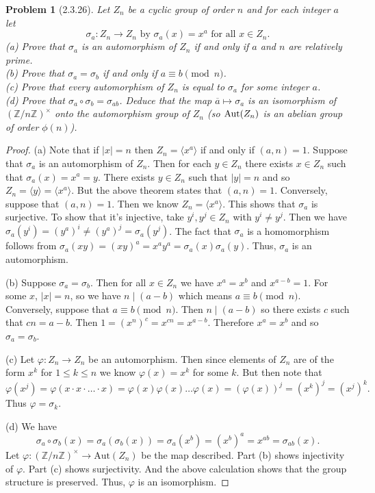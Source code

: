 \documentclass{article}
\newtheorem{problem}{Problem}
\begin{document}
\begin{problem}[2.3.26]
Let $Z_n$ be a cyclic group of order $n$ and for each integer $a$ let
\[
\sigma_a : Z_n \to Z_n \text{ by } \sigma_a(x) = x^a \text{ for all } x \in Z_n.
\]
(a) Prove that $\sigma_a$ is an automorphism of $Z_n$ if and only if $a$ and $n$ are relatively prime.\\
(b) Prove that $\sigma_a = \sigma_b$ if and only if $a \equiv b \pmod{n}$.\\
(c) Prove that \emph{every} automorphism of $Z_n$ is equal to $\sigma_a$ for some integer $a$.\\
(d) Prove that $\sigma_a \circ \sigma_b = \sigma_{ab}$. Deduce that the map $\overline{a} \mapsto \sigma_a$ is an isomorphism of $(\mathbb{Z}/n\mathbb{Z})^{\times}$ onto the automorphism group of $Z_n$ (so $\textup{Aut}(Z_n)$ is an abelian group of order $\phi(n)$).
\end{problem}
\begin{proof}
(a) Note that if $|x| = n$ then $Z_n = \langle x^a \rangle$ if and only if $(a,n) = 1$. Suppose that $\sigma_a$ is an automorphism of $Z_n$. Then for each $y \in Z_n$ there exists $x \in Z_n$ such that $\sigma_a(x) = x^a = y$. There exists $y \in Z_n$ such that $|y| = n$ and so $Z_n = \langle y \rangle = \langle x^a \rangle$. But the above theorem states that $(a,n) = 1$. Conversely, suppose that $(a,n) = 1$. Then we know $Z_n = \langle x^a \rangle$. This shows that $\sigma_a$ is surjective. To show that it's injective, take $y^i,y^j \in Z_n$ with $y^i \neq y^j$. Then we have $\sigma_a(y^i) = (y^a)^i \neq (y^a)^j = \sigma_a(y^j)$. The fact that $\sigma_a$ is a homomorphism follows from $\sigma_a(xy) = (xy)^a = x^ay^a = \sigma_a(x)\sigma_a(y)$. Thus, $\sigma_a$ is an automorphism.

(b) Suppose $\sigma_a = \sigma_b$. Then for all $x \in Z_n$ we have $x^a = x^b$ and $x^{a-b} = 1$. For some $x$, $|x| = n$, so we have $n \mid (a-b)$ which means $a \equiv b \pmod{n}$. Conversely, suppose that $a \equiv b \pmod{n}$. Then $n \mid (a-b)$ so there exists $c$ such that $cn = a-b$. Then $1 = (x^n)^c = x^{cn} = x^{a-b}$. Therefore $x^a = x^b$ and so $\sigma_a = \sigma_b$.

(c) Let $\varphi : Z_n \to Z_n$ be an automorphism. Then since elements of $Z_n$ are of the form $x^k$ for $1 \leq k \leq n$ we know $\varphi(x) = x^k$ for some $k$. But then note that
\[
\varphi(x^j) = \varphi(x\cdot x\cdot \dots \cdot x) = \varphi(x)\varphi(x) \dots \varphi(x) = (\varphi(x))^j = (x^k)^j = (x^j)^k.
\]
Thus $\varphi = \sigma_k$.

(d) We have
\[
\sigma_a \circ \sigma_b(x) = \sigma_a(\sigma_b(x)) = \sigma_a(x^b) = (x^b)^a = x^{ab} = \sigma_{ab}(x).
\]
Let $\varphi : (\mathbb{Z}/n\mathbb{Z})^{\times} \to \text{Aut}(Z_n)$ be the map described. Part (b) shows injectivity of $\varphi$. Part (c) shows surjectivity. And the above calculation shows that the group structure is preserved. Thus, $\varphi$ is an isomorphism.
\end{proof}
\end{document}

